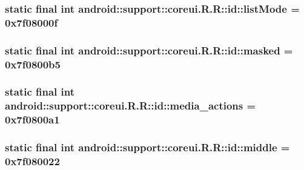 \hypertarget{classandroid_1_1support_1_1coreui_1_1_r_1_1id_e875acadcd83acfcd58d437e39b5ee9a}{
\subsubsection[{listMode}]{\setlength{\rightskip}{0pt plus 5cm}static final int android::support::coreui.R.R::id::listMode = 0x7f08000f}}
\label{classandroid_1_1support_1_1coreui_1_1_r_1_1id_e875acadcd83acfcd58d437e39b5ee9a}


\hypertarget{classandroid_1_1support_1_1coreui_1_1_r_1_1id_0812a61e3cf90f34c1124730a01c9332}{
\subsubsection[{masked}]{\setlength{\rightskip}{0pt plus 5cm}static final int android::support::coreui.R.R::id::masked = 0x7f0800b5}}
\label{classandroid_1_1support_1_1coreui_1_1_r_1_1id_0812a61e3cf90f34c1124730a01c9332}


\hypertarget{classandroid_1_1support_1_1coreui_1_1_r_1_1id_bb0e487502ccce9c2284911ac667b902}{
\subsubsection[{media\_\-actions}]{\setlength{\rightskip}{0pt plus 5cm}static final int android::support::coreui.R.R::id::media\_\-actions = 0x7f0800a1}}
\label{classandroid_1_1support_1_1coreui_1_1_r_1_1id_bb0e487502ccce9c2284911ac667b902}


\hypertarget{classandroid_1_1support_1_1coreui_1_1_r_1_1id_5fe5a59177bb8acb8c06797830e9a4d9}{
\subsubsection[{middle}]{\setlength{\rightskip}{0pt plus 5cm}static final int android::support::coreui.R.R::id::middle = 0x7f080022}}
\label{classandroid_1_1support_1_1coreui_1_1_r_1_1id_5fe5a59177bb8acb8c06797830e9a4d9}


